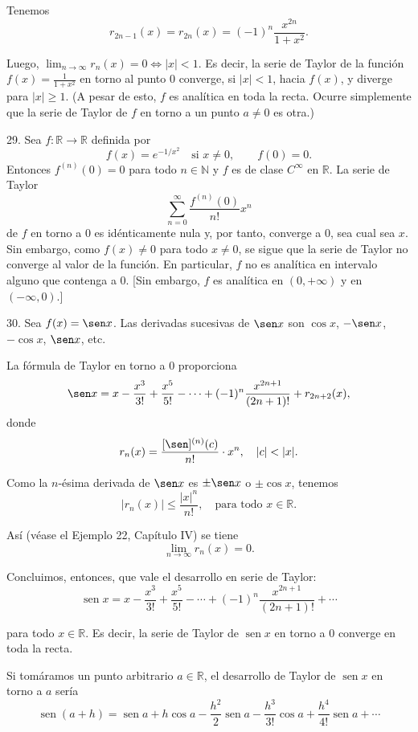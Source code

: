 \documentclass[12pt,oneside]{book}
\begin{document}
Tenemos
\[
r_{2n-1}(x) = r_{2n}(x) = (-1)^n \frac{x^{2n}}{1 + x^2}.
\]

Luego, \( \lim_{n \to \infty} r_n(x) = 0 \Leftrightarrow |x| < 1 \). Es decir, la serie de Taylor de la función \( f(x) = \frac{1}{1 + x^2} \) en torno al punto \( 0 \) converge, si \( |x| < 1 \), hacia \( f(x) \), y diverge para \( |x| \geq 1 \). (A pesar de esto, \( f \) es analítica en toda la recta. Ocurre simplemente que la serie de Taylor de \( f \) en torno a un punto \( a \neq 0 \) es otra.)

29. Sea \( f: \mathbb{R} \to \mathbb{R} \) definida por
\[
f(x) = e^{-1/x^2} \quad \text{si } x \neq 0, \qquad f(0) = 0.
\]
Entonces \( f^{(n)}(0) = 0 \) para todo \( n \in \mathbb{N} \) y \( f \) es de clase \( C^\infty \) en \( \mathbb{R} \). La serie de Taylor
\[
\sum_{n=0}^{\infty} \frac{f^{(n)}(0)}{n!} x^n
\]
de \( f \) en torno a \( 0 \) es idénticamente nula y, por tanto, converge a \( 0 \), sea cual sea \( x \). Sin embargo, como \( f(x) \neq 0 \) para todo \( x \neq 0 \), se sigue que la serie de Taylor no converge al valor de la función. En particular, \( f \) no es analítica en intervalo alguno que contenga a \( 0 \). [Sin embargo, \( f \) es analítica en \( (0, +\infty) \) y en \( (-\infty, 0) \).]

30. Sea \( f(x) = \sen x \). Las derivadas sucesivas de \( \sen x \) son \( \cos x \), \( -\sen x \), \( -\cos x \), \( \sen x \), etc.

La fórmula de Taylor en torno a \( 0 \) proporciona
\[
\sen x = x - \frac{x^3}{3!} + \frac{x^5}{5!} - \cdots + (-1)^n \frac{x^{2n+1}}{(2n+1)!} + r_{2n+2}(x),
\]
donde
\[
r_n(x) = \frac{[\sen]^{(n)}(c)}{n!} \cdot x^n, \quad |c| < |x|.
\]

Como la \( n \)-ésima derivada de \( \sen x \) es \( \pm \sen x \) o \( \pm \cos x \), tenemos
\[
|r_n(x)| \leq \frac{|x|^n}{n!}, \quad \text{para todo } x \in \mathbb{R}.
\]

Así (véase el Ejemplo 22, Capítulo IV) se tiene
\[
\lim_{n \to \infty} r_n(x) = 0.
\]

Concluimos, entonces, que vale el desarrollo en serie de Taylor:
\[
\operatorname{sen} x = x - \frac{x^3}{3!} + \frac{x^5}{5!} - \cdots + (-1)^n \frac{x^{2n+1}}{(2n+1)!} + \cdots
\]

para todo \( x \in \mathbb{R} \). Es decir, la serie de Taylor de \( \operatorname{sen} x \) en torno a \( 0 \) converge en toda la recta.

Si tomáramos un punto arbitrario \( a \in \mathbb{R} \), el desarrollo de Taylor de \( \operatorname{sen} x \) en torno a \( a \) sería
\[
\operatorname{sen}(a+h) = \operatorname{sen} a + h \cos a - \frac{h^2}{2} \operatorname{sen} a - \frac{h^3}{3!} \cos a + \frac{h^4}{4!} \operatorname{sen} a + \cdots
\]
\end{document}

